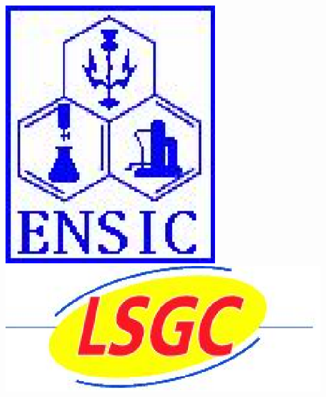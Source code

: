 \begin{minipage}[t]{1\linewidth}
\begin{minipage}[t]{0.2\linewidth}
\begin{center}
      \vspace{1cm}
      \includegraphics[width=0.6\textwidth]{pictures/logoensic2}
      \vspace{2cm}
      \includegraphics[width=0.9\textwidth]{pictures/logolsgc}
    \end{center}
    \vspace{10.6cm}
  \end{minipage}
\end{minipage}



